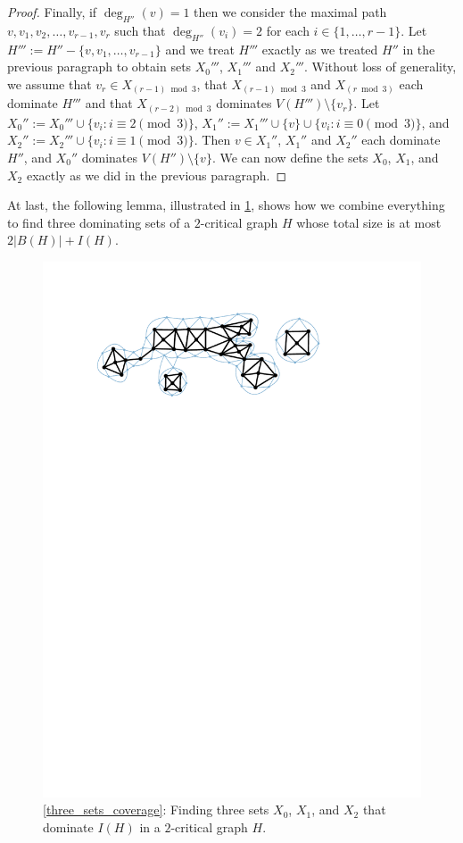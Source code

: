 \documentclass[12pt]{article}
\theoremstyle{definition}
\begin{document}
\begin{proof}
  Finally, if $\deg_{H''}(v)=1$ then we consider the maximal path $v,v_1,v_2,\ldots,v_{r-1},v_r$ such that $\deg_{H''}(v_i)=2$ for each $i\in\{1,\ldots,r-1\}$.  Let $H''':=H''-\{v,v_1,\ldots,v_{r-1}\}$ and we treat $H'''$ exactly as we treated $H''$ in the previous paragraph to obtain sets $X_0'''$, $X_1'''$ and $X_2'''$.  Without loss of generality, we assume that $v_r\in X_{(r-1)\bmod 3}$, that $X_{(r-1)\bmod 3}$ and $X_{(r\bmod 3)}$ each dominate $H'''$ and that $X_{(r-2)\bmod 3}$ dominates  $V(H''')\setminus\{v_r\}$. Let $X_0'':=X_0'''\cup\{v_i:i\equiv 2\pmod 3\}$, $X_1'':=X_1'''\cup\{v\}\cup\{v_i:i\equiv 0\pmod 3\}$, and  $X_2'':=X_2'''\cup\{v_i:i\equiv 1\pmod 3\}$.  Then $v\in X_1''$, $X_1''$ and $X_2''$ each dominate $H''$, and $X_0''$ dominates $V(H'')\setminus\{v\}$.  We can now define the sets $X_0$, $X_1$, and $X_2$ exactly as we did in the previous paragraph.
\end{proof}


At last, the following lemma, illustrated in \cref{two_critical_colouring}, shows how we combine everything to find three dominating sets of a $2$-critical graph $H$ whose total size is at most $2|B(H)| + I(H)$.

\begin{figure}
  \centering
  \includegraphics[page=4]{figs/two_critical}
  \caption{\cref{three_sets_coverage}: Finding three sets $X_0$, $X_1$, and $X_2$ that dominate $I(H)$ in a $2$-critical graph $H$.}
  \label{two_critical_colouring}
\end{figure}
\end{document}
